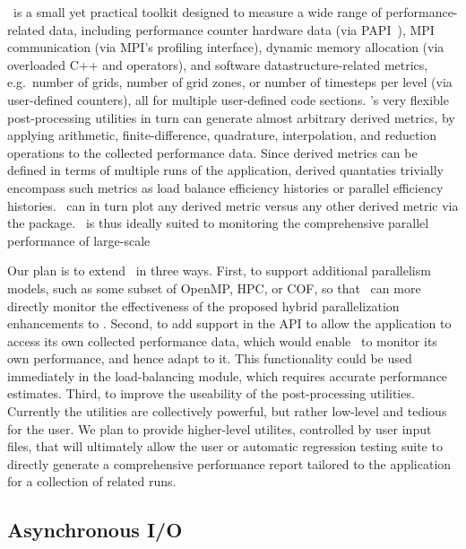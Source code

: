 \documentclass{article}
\begin{document}
\lcaperf\ is a small yet practical toolkit
 designed to measure a wide range of performance-related data,
 including performance counter hardware data (via PAPI~\cite{BrDo00}),
 MPI communication (via MPI's profiling interface), dynamic memory
 allocation (via overloaded C++  and 
 operators), and software datastructure-related metrics, e.g.~number
 of grids, number of grid zones, or number of timesteps per level (via
 user-defined counters), all for multiple user-defined code sections.
 \lcaperf's very flexible post-processing utilities in turn can
 generate almost arbitrary derived metrics, by applying arithmetic,
 finite-difference, quadrature, interpolation, and reduction
 operations to the collected performance data.  Since derived metrics
 can be defined in terms of multiple runs of the application, derived
 quantaties trivially encompass such metrics as load balance
 efficiency histories or parallel efficiency histories.  \lcaperf\ can
 in turn plot any derived metric versus any other derived metric via
 the  package.  \lcaperf\ is thus ideally suited to
 monitoring the comprehensive parallel performance of large-scale

 Our plan is to extend \lcaperf\ in three ways.  First, to support
 additional parallelism models, such as some subset of OpenMP, HPC, or
 COF, so that \lcaperf\ can more directly monitor the effectiveness of
 the proposed hybrid parallelization enhancements to \enzo.  Second,
 to add support in the API to allow the application to access its own
 collected performance data, which would enable \enzo\ to monitor its
 own performance, and hence adapt to it.  This functionality could be
 used immediately in the load-balancing module, which requires
 accurate performance estimates.  Third, to improve the useability of
 the post-processing utilities.  Currently the utilities are
 collectively powerful, but rather low-level and tedious for the user.
 We plan to provide higher-level utilites, controlled by user input
 files, that will ultimately allow the user or automatic regression
 testing suite to directly generate a comprehensive performance report
 tailored to the application for a collection of related runs.


\subsection{Asynchronous I/O} \label{solution:data-io-asynch}
\end{document}
